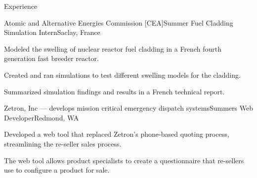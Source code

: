 \documentclass{resume} %
\begin{document}
\begin{rSection}{Experience}
\begin{rSubsection}{Atomic and Alternative Energies Commission [CEA]}{Summer }{Fuel Cladding Simulation Intern}{Saclay, France}
\item Modeled the swelling of nuclear reactor fuel cladding in a French fourth generation fast breeder reactor.
\item Created and ran simulations to test different swelling models for the cladding.
\item Summarized simulation findings and results in a French technical report.
\end{rSubsection}




\begin{rSubsection}{Zetron, Inc \textnormal{--- develops mission critical emergency dispatch systems}}{Summers }{Web Developer}{Redmond, WA}
\item Developed a web tool that replaced Zetron's phone-based quoting process, streamlining the re-seller sales process.
\item The web tool allows product specialists to create a questionnaire that re-sellers use to configure a product for sale.
\end{rSubsection}


\end{rSection}
\end{document}
